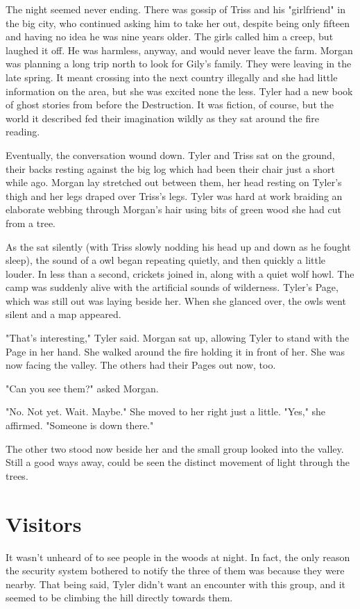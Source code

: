 \documentclass[courier]{sffms}
\begin{document}
The night seemed never ending.
There was gossip of Triss and his "girlfriend" in the big
city, who continued asking him to take her out,
despite being only fifteen and having no idea he
was nine years older. The girls called him a creep,
but laughed it off. He was harmless, anyway,
and would never leave the farm.
Morgan was planning a long trip north to look
for Gily's family. They were leaving in the late
spring. It meant crossing into the next country
illegally and she had little information on the area,
but she was excited none the less. Tyler had a new
book of ghost stories from before the Destruction.
It was fiction, of course, but the world it described
fed their imagination wildly as they sat around the
fire reading.

Eventually, the conversation wound down. Tyler and
Triss sat on the ground, their backs resting against
the big log which had been their chair just a short
while ago. Morgan lay stretched out between them,
her head resting on Tyler's thigh and her legs draped
over Triss's legs. Tyler was hard at work braiding an
elaborate webbing through Morgan's hair using bits of
green wood she had cut from a tree.

As the sat silently (with Triss slowly nodding his head
up and down as he fought sleep), the sound of a owl
began repeating quietly, and then quickly a little
louder. In less than a second, crickets joined in, along
with a quiet wolf howl. The camp was suddenly alive
with the artificial sounds of wilderness. Tyler's Page,
which was still out was laying beside her. When she
glanced over, the owls went silent and a map appeared.

"That's interesting," Tyler said. Morgan sat up, allowing
Tyler to stand with the Page in her hand. She walked
around the fire holding it in front of her. She was now
facing the valley. The others had their Pages out now,
too.

"Can you see them?" asked Morgan.

"No. Not yet. Wait. Maybe." She moved to her right
just a little. "Yes," she affirmed. "Someone is down
there."

The other two stood now beside her and the small group
looked into the valley. Still a good ways away, could be
seen the distinct movement of light through the trees.

\chapter{Visitors}
It wasn't unheard of to see people in the woods at
night. In fact, the only reason the security system
bothered to notify the three of them was because
they were nearby. That being said, Tyler didn't want
an encounter with this group, and it seemed to be
climbing the hill directly towards them.
\end{document}
